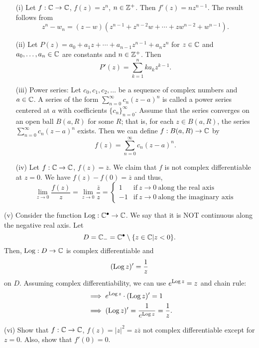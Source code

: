 \documentclass[a4paper]{article}
\begin{document}
 \begin{eg}
    \begin{enumerate}
        \item[(i)] Let \( f: \mathbb{C} \to \mathbb{C}  \), \( f(z) = z^{n} \), \( n \in \mathbb{Z}^{+} \). Then \( f'(z) = n z^{n-1} \). The result follows from 
            \[  z^{n} - {w}_{n} = (z-w) (z^{n-1} + z^{n-2} w + \cdots + z w^{n-2} + w^{n-1}). \]
        \item[(ii)] Let \( P(z) = {a}_{0} + {a}_{1} z + \cdots + {a}_{n-1} z^{n-1} + {a}_{n} z^{n} \) for \( z \in \mathbb{C}  \) and \( {a}_{0}, \dots , {a}_{n} \in \mathbb{C}  \) are constants and \( n \in \mathbb{Z}^{+} \). Then
            \[  P'(z) = \sum_{ k=1  }^{ n } k {a}_{k} z^{k-1}.  \]
        \item[(iii)] Power series:
            Let \( {c}_{0}, {c}_{1}, {c}_{2}, \dots  \) be a sequence of complex numbers and \( a \in \mathbb{C}  \). A series of the form \( \sum_{ n=0  }^{ \infty} {c}_{n} (z- a )^{n}   \) is called a power series centered at \( a  \) with coefficients \( \{ {c}_{n} \}_{n=0}^{\infty } \). Assume that the series converges on an open ball \( B(a,R) \) for some \( R  \); that is, for each \( z \in B(a,R) \), the series \( \sum_{ n=0 }^{ \infty  } {c}_{n} (z-a)^{n} \) exists. Then we can define \( f: B(a,R) \to \mathbb{C}  \) by
            \[  f(z) = \sum_{ n=0  }^{ \infty  } {c}_{n} (z-a)^{n}. \]
        \item[(iv)] Let \( f: \mathbb{C} \to \mathbb{C}  \), \( f(z) = \overline{z} \). We claim that \( f \) is not complex differentiable at \( z = 0  \). We have \( f(z) - f(0) = \overline{z} \) and thus,
            \[  \lim_{ z \to 0 }  \frac{ f(z) }{ z    }  =  \lim_{ z \to 0 } \frac{ \overline{z} }{ z } = 
            \begin{cases}
                1 &\text{if} \ z \to 0 \ \text{along the real axis} \\
                -1 &\text{if} \ z \to 0 \  \text{along the imaginary axis}
            \end{cases} \]
    \end{enumerate} 
    \item[(v)] Consider the function \( \operatorname{Log}: \mathbb{C}^{\bullet} \to \mathbb{C}  \). We say that it is NOT continuous along the negative real axis. Let 
        \[  D = {\mathbb{C}}_{-} = \mathbb{C}^{\bullet} \setminus  \{ z \in \mathbb{C} | z < 0 \}. \]
        Then, \( \operatorname{Log}: D \to \mathbb{C}  \) is complex differentiable and 
        \[  (\operatorname{Log} z)' = \frac{ 1 }{ z }   \]
        on \( D  \).
        Assuming complex differentiability, we can use \( e^{\operatorname{Log} z } = z  \) and chain rule:
        \begin{align*}
            &\implies e^{\operatorname{Log} z} \cdot (\operatorname{Log} z)' = 1 \\
            &\implies (\operatorname{Log} z )' = \frac{ 1 }{ e^{\operatorname{Log} z}  }  = \frac{ 1 }{ z }. 
        \end{align*}
    \item[(vi)] Show that \( f: \mathbb{C} \to \mathbb{C}  \), \( f(z) = | z |^{2}  = z \overline{z} \) not complex differentiable except for \( z = 0 \). Also, show that \( f'(0) = 0  \).
 \end{eg}
\end{document}
